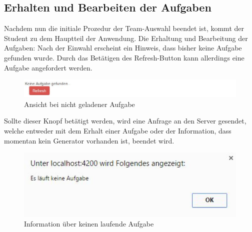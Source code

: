 \subsection{Erhalten und Bearbeiten der Aufgaben}

Nachdem nun die initiale Prozedur der Team-Auswahl beendet ist, kommt der Student zu dem Hauptteil der Anwendung. Die Erhaltung und Bearbeitung der Aufgaben: Nach der Einwahl erscheint ein Hinweis, dass bisher keine Aufgabe gefunden wurde. Durch das Betätigen des Refresh-Button kann allerdings eine Aufgabe angefordert werden. \\
\begin{figure}[htp]     %
\centering
\includegraphics[width=1\textwidth]{bilder/NoTask} 
\caption[Ansicht bei nicht geladener Aufgabe]{Ansicht bei nicht geladener Aufgabe}
\end{figure} 

Sollte dieser Knopf betätigt werden, wird eine Anfrage an den Server gesendet, welche entweder mit dem Erhalt einer Aufgabe oder der Information, dass momentan kein Generator vorhanden ist, beendet wird. \\

\begin{figure}[htp]     %
\centering
\includegraphics[width=1\textwidth]{bilder/NoTaskRunning} 
\caption[Information über keine laufende Aufgabe]{Information über keinen laufende Aufgabe}
\end{figure} 

